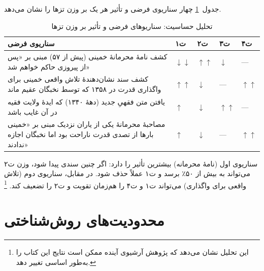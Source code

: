 \documentclass[12pt,a4paper]{book}
\begin{document}
جدول~\ref{tab:sensitivity} چهار سناریوی فرضی و
تأثیر هر یک بر وزن تزها را نشان می‌دهد.

{%
\small
\begin{longtable}{%
  >{\arraybackslash}m{5cm}
  >{\centering\arraybackslash}m{1.5cm}
  >{\centering\arraybackslash}m{1.5cm}
  >{\centering\arraybackslash}m{1.5cm}
  >{\centering\arraybackslash}m{1.5cm}}
\caption{تحلیل حساسیت: سناریوهای فرضی و تأثیر بر وزن تزها}
\label{tab:sensitivity} \\
\toprule
\textbf{سناریوی فرضی}
  & \cellcolor{cGreen!15}\textbf{ت‌۱}
  & \cellcolor{cAccent!15}\textbf{ت‌۲}
  & \cellcolor{cGold!15}\textbf{ت‌۳}
  & \cellcolor{cConsolid!15}\textbf{ت‌۴} \\
\midrule
\endfirsthead
\bottomrule
\endlastfoot

کشف نامهٔ محرمانهٔ خمینی (پیش از ۵۷) مبنی بر «پس از پیروزی حاکم خواهم شد»
  & $\downarrow\downarrow$
  & $\uparrow\uparrow$
  & $\downarrow$
  & — \\
\addlinespace

کشف سند نشان‌دهندهٔ تلاش واقعی خمینی برای واگذاری قدرت در ۱۳۵۸ که توسط نخبگان عقیم ماند
  & $\uparrow\uparrow$
  & $\downarrow$
  & —
  & $\uparrow\uparrow$ \\
\addlinespace

یافتن متن فقهیِ جدید (دههٔ ۱۳۴۰) که ایدهٔ ولایت فقیه در آن غایب باشد
  & $\uparrow$
  & $\downarrow$
  & $\uparrow\uparrow$
  & — \\
\addlinespace

مصاحبهٔ محرمانهٔ یکی از یاران نزدیک مبنی بر «خمینی بارها از تصدی قدرت ناراحت بود اما نخبگان اجازه ندادند»
  & $\uparrow$
  & $\downarrow$
  & —
  & $\uparrow\uparrow$ \\

\end{longtable}
}

\begin{noteBox}
سناریوی اول (نامهٔ محرمانه) بیشترین تأثیر را دارد:
اگر چنین سندی پیدا شود،
وزن ت‌۲ می‌تواند به بیش از ۵۰٪ برسد
و ت‌۱ عملاً حذف شود.
در مقابل، سناریوی دوم (تلاش واقعی برای واگذاری)
می‌تواند ت‌۱ و ت‌۴ را هم‌زمان تقویت
و ت‌۲ را تضعیف کند.%
\footnote{این تحلیل نشان می‌دهد که پژوهش آرشیوی آینده
ممکن است نتایج این کتاب را به‌طور اساسی تغییر دهد.}
\end{noteBox}

\section{محدودیت‌های روش‌شناختی}
\label{sec:ch15-limitations}
\end{document}
